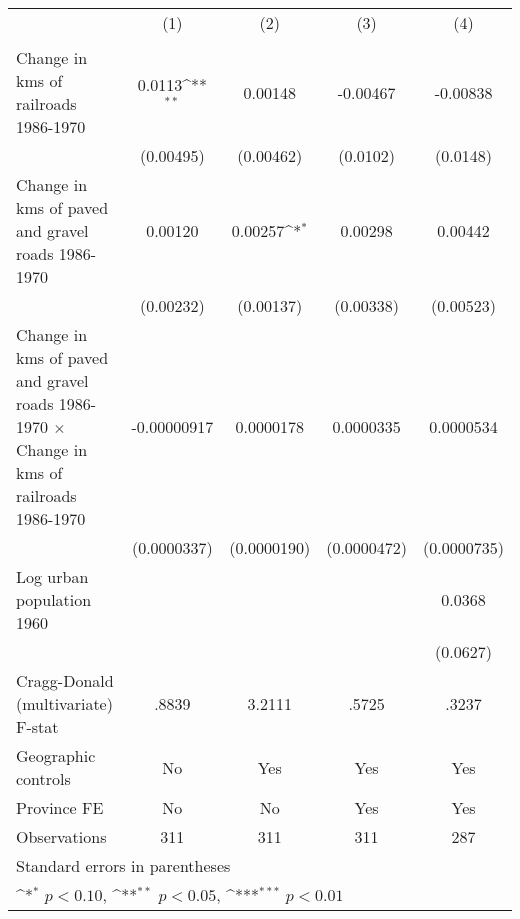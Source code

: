 {
\def\sym#1{\ifmmode^{#1}\else\(^{#1}\)\fi}
\begin{tabular}{l*{4}{c}}
\hline\hline
                &\multicolumn{1}{c}{(1)}&\multicolumn{1}{c}{(2)}&\multicolumn{1}{c}{(3)}&\multicolumn{1}{c}{(4)}\\
                &\multicolumn{1}{c}{}&\multicolumn{1}{c}{}&\multicolumn{1}{c}{}&\multicolumn{1}{c}{}\\
\hline
Change in kms of railroads 1986-1970&   0.0113\sym{**} &  0.00148         & -0.00467         & -0.00838         \\
                &(0.00495)         &(0.00462)         & (0.0102)         & (0.0148)         \\
[1em]
Change in kms of paved and gravel roads 1986-1970&  0.00120         &  0.00257\sym{*}  &  0.00298         &  0.00442         \\
                &(0.00232)         &(0.00137)         &(0.00338)         &(0.00523)         \\
[1em]
Change in kms of paved and gravel roads 1986-1970 $\times$ Change in kms of railroads 1986-1970&-0.00000917         &0.0000178         &0.0000335         &0.0000534         \\
                &(0.0000337)         &(0.0000190)         &(0.0000472)         &(0.0000735)         \\
[1em]
Log urban population 1960&                  &                  &                  &   0.0368         \\
                &                  &                  &                  & (0.0627)         \\
\hline
Cragg-Donald (multivariate) F-stat&    .8839         &   3.2111         &    .5725         &    .3237         \\
Geographic controls&       No         &      Yes         &      Yes         &      Yes         \\
Province FE     &       No         &       No         &      Yes         &      Yes         \\
Observations    &      311         &      311         &      311         &      287         \\
\hline\hline
\multicolumn{5}{l}{\footnotesize Standard errors in parentheses}\\
\multicolumn{5}{l}{\footnotesize \sym{*} \(p<0.10\), \sym{**} \(p<0.05\), \sym{***} \(p<0.01\)}\\
\end{tabular}
}
